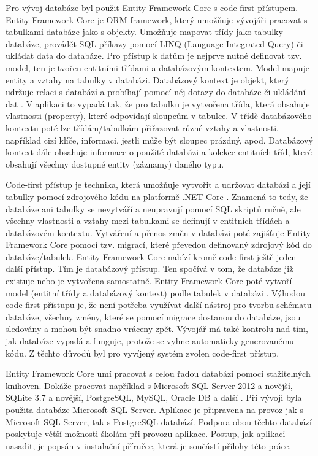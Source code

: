 Pro vývoj databáze byl použit Entity Framework Core s code-first přístupem. Entity Framework Core je ORM framework, který umožňuje vývojáři pracovat s tabulkami databáze jako s objekty. Umožňuje mapovat třídy jako tabulky databáze, provádět SQL příkazy pomocí LINQ (Language Integrated Query) či ukládat data do databáze. Pro přístup k datům je nejprve nutné definovat tzv. model, ten je tvořen entitními třídami a databázovým kontextem. Model mapuje entity a vztahy na tabulky v databázi. Databázový kontext je objekt, který udržuje relaci s databází a probíhají pomocí něj dotazy do databáze či ukládání dat \cite{ef-core}. V aplikaci to vypadá tak, že pro tabulku je vytvořena třída, která obsahuje vlastnosti (property), které odpovídají sloupcům v tabulce. V třídě databázového kontextu poté lze třídám/tabulkám přiřazovat různé vztahy a vlastnosti, například cizí klíče, informaci, jestli může být sloupec prázdný, apod. Databázový kontext dále obsahuje informace o použité databázi a kolekce entitních tříd, které obsahují všechny dostupné entity (záznamy) daného typu.

Code-first přístup je technika, která umožňuje vytvořit a udržovat databázi a její tabulky pomocí zdrojového kódu na platformě .NET Core \cite{code-first}. Znamená to tedy, že databáze ani tabulky se nevytváří a neupravují pomocí SQL skriptů ručně, ale všechny vlastnosti a vztahy mezi tabulkami se definují v entitních třídách a databázovém kontextu. Vytváření a přenos změn v databázi poté zajišťuje Entity Framework Core pomocí tzv. migrací, které převedou definovaný zdrojový kód do databáze/tabulek. Entity Framework Core nabízí kromě code-first ještě jeden další přístup. Tím je databázový přístup. Ten spočívá v tom, že databáze již existuje nebo je vytvořena samostatně. Entity Framework Core poté vytvoří model (entitní třídy a databázový kontext) podle tabulek v databázi \cite{ef-core}. Výhodou code-first přístupu je, že není potřeba využívat další nástroj pro tvorbu schématu databáze, všechny změny, které se pomocí migrace dostanou do databáze, jsou sledovány a mohou být snadno vráceny zpět. Vývojář má také kontrolu nad tím, jak databáze vypadá a funguje, protože se vyhne automaticky generovanému kódu. Z těchto důvodů byl pro vyvíjený systém zvolen code-first přístup.

Entity Framework Core umí pracovat s celou řadou databází pomocí stažitelných knihoven. Dokáže pracovat například s Microsoft SQL Server 2012 a novější, SQLite 3.7 a novější, PostgreSQL, MySQL, Oracle DB a další \cite{database-providers}. Při vývoji byla použita databáze Microsoft SQL Server. Aplikace je připravena na provoz jak s Microsoft SQL Server, tak s PostgreSQL databází. Podpora obou těchto databází poskytuje větší možnosti školám při provozu aplikace. Postup, jak aplikaci nasadit, je popsán v instalační příručce, která je součástí přílohy této práce.

